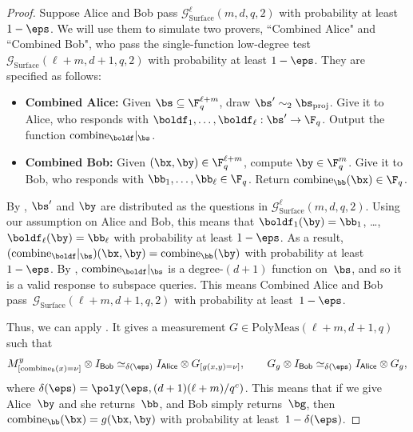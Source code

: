 \documentclass[11pt]{article}
\newcommand{\consistency}{\simeq}
\newcommand{\polymeas}[3]{\mathrm{PolyMeas}(#1,#2,#3)}
\newcommand{\game}{\mathscr{G}}
\newcommand{\reg}[1]{{\mathsf{#1}}}
\begin{document}
\begin{proof}
Suppose Alice and Bob pass $\game_{\mathrm{Surface}}^\ell(m, d, q,2)$ with probability at least $1-\eps$.
We will use them to simulate two provers, ``Combined Alice" and ``Combined Bob", who pass
the single-function low-degree test $\game_{\mathrm{Surface}}(\ell + m, d+1, q,2)$ with probability at least $1-\eps$.
They are specified as follows:
\begin{itemize}
\item[$\circ$] \textbf{Combined Alice:} Given $\bs \subseteq \F_q^{\ell + m}$, draw $\bs' \sim_2 \bs_{\mathrm{proj}}$.  Give it to Alice, who responds with $\boldf_1, \ldots, \boldf_{\ell}: \bs' \rightarrow \F_q$.  Output the function $\mathrm{combine}_{\boldf}|_{\bs}$.
\item[$\circ$] \textbf{Combined Bob:} Given $(\bx, \by) \in \F_q^{\ell + m}$, compute $\by \in \F_q^m$. Give it to Bob, who responds with $\bb_1, \ldots, \bb_\ell \in \F_q$.
			Return $\mathrm{combine}_{\bb}(\bx) \in \F_q$.
\end{itemize}
By , $\bs'$ and $\by$ are distributed as the questions in $\game_{\mathrm{Surface}}^\ell(m, d, q,2)$.
Using our assumption on Alice and Bob, this means that $\boldf_1(\by) = \bb_1$, \ldots, $\boldf_\ell(\by) = \bb_\ell$ with probability at least $1-\eps$.
As a result, $(\mathrm{combine}_{\boldf}|_{\bs})(\bx, \by) = \mathrm{combine}_{\bb}(\by)$ with probability at least~$1-\eps$.
By , $\mathrm{combine}_{\boldf}|_{\bs}$ is a degree-$(d+1)$ function on~$\bs$,
and so it is a valid response to subspace queries.
This means Combined Alice and Bob pass~$\game_{\mathrm{Surface}}(\ell + m, d+1, q, 2)$ with probability at least~$1-\eps$.

Thus, we can apply .
It gives a measurement $G \in \polymeas{\ell+m}{d+1}{q}$ such that
\begin{equation}\label{eq:g-meas-equals-combine-meas}
M^y_{[\mathrm{combine}_b(x)=\nu]} \otimes I_{\reg{Bob}}
\consistency_{\delta(\eps)} I_{\reg{Alice}} \otimes G_{[g(x, y) = \nu]},
\qquad
G_g \otimes I_{\reg{Bob}} \consistency_{\delta(\eps)} I_{\reg{Alice}} \otimes G_g,
\end{equation}
where $\delta(\eps) = \poly(\eps, (d+1)(\ell+m)/q^c)$.
This means that if we give Alice~$\by$ and she returns~$\bb$, and Bob simply returns~$\bg$,
then $\mathrm{combine}_{\bb}(\bx) = g(\bx, \by)$ with probability at least~$1-\delta(\eps)$.


\end{proof}
\end{document}
